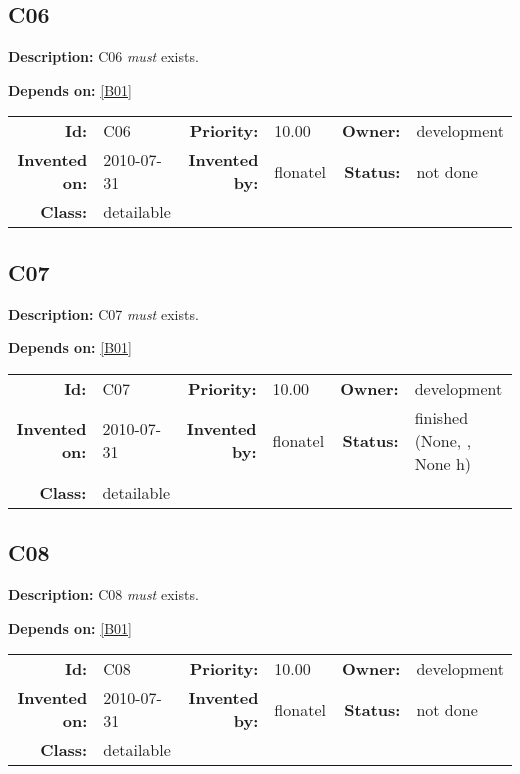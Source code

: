\subsection{C06}\label{C06}
\textbf{Description:} C06 \textsl{must} exists.

\textbf{Depends on:} \ref{B01} 

\par
{\small \begin{center}\begin{tabular}{rlrlrl}
\textbf{Id:} & C06  & \textbf{Priority:} & 10.00  & \textbf{Owner:} & development\\ 
\textbf{Invented on:} & 2010-07-31  & \textbf{Invented by:} & flonatel  & \textbf{Status:} & not done \\ 
\textbf{Class:} & detailable  & & & \end{tabular}\end{center} }

\subsection{C07}\label{C07}
\textbf{Description:} C07 \textsl{must} exists.

\textbf{Depends on:} \ref{B01} 

\par
{\small \begin{center}\begin{tabular}{rlrlrl}
\textbf{Id:} & C07  & \textbf{Priority:} & 10.00  & \textbf{Owner:} & development\\ 
\textbf{Invented on:} & 2010-07-31  & \textbf{Invented by:} & flonatel  & \textbf{Status:} & finished (None, , None h) \\ 
\textbf{Class:} & detailable  & & & \end{tabular}\end{center} }

\subsection{C08}\label{C08}
\textbf{Description:} C08 \textsl{must} exists.

\textbf{Depends on:} \ref{B01} 

\par
{\small \begin{center}\begin{tabular}{rlrlrl}
\textbf{Id:} & C08  & \textbf{Priority:} & 10.00  & \textbf{Owner:} & development\\ 
\textbf{Invented on:} & 2010-07-31  & \textbf{Invented by:} & flonatel  & \textbf{Status:} & not done \\ 
\textbf{Class:} & detailable  & & & \end{tabular}\end{center} }

